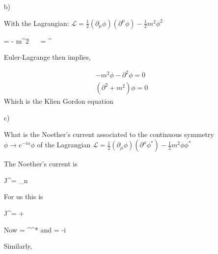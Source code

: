 {\begin{itemize}
\begin{align*}
\delta S = \int d^4x \left[ \frac{\partial \bigL}{\partial \phi} {\delta \phi} - \partial_\mu \left(\frac{\partial \bigL}{\partial (\partial_\mu \phi)} \right) \delta \phi  \right]\\
= \int d^4x \left[ \frac{\partial \bigL}{\partial \phi}  - \partial_\mu \left(\frac{\partial \bigL}{\partial (\partial_\mu \phi)} \right)   \right] {\delta \phi}\\
\end{align*}

The change in the action can be 0 only if 
\be
{} - \partial_\mu {} = 0.
\ee

\item[b)]{
  With the Lagrangian: $\mathscr{L}= \frac{1}{2}(\partial_\mu \phi)(\partial^{\mu}\phi) - \frac{1}{2}m^2\phi^2$

\be
\frac{\partial \bigL}{\partial \phi} = - m^2 \phi\   \  \frac{\partial \bigL}{\partial (\partial_\rho \phi)} = \partial^\rho \phi
\ee
}

Euler-Lagrange  then implies,

\begin{align*}
- m^2 \phi - \partial^2 \phi = 0 \\
(\partial^2 + m^2)\phi = 0
\end{align*}
Which is the Klien Gordon equation

\item[c)]{What is the Noether's current associated to the continuous symmetry $\phi \rightarrow e^{-i\alpha} \phi$ of the Lagrangian $\mathscr{L}= \frac{1}{2}(\partial_\mu \phi)(\partial^{\mu}\phi^*) - \frac{1}{2}m^2\phi\phi^*$

The Noether's current is 

\be
J^\mu = \sum_n  
\ee

For us this is

\be
J^\mu =   +     
\ee

Now
\be
{} =  \partial^\mu \phi^*
\ee
and
\be
{} = -i \phi
\ee

Similarly,


}
\end{itemize}}
